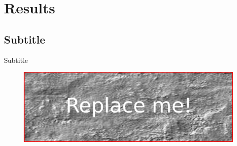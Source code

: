 \section{Results}
\subsection{Subtitle}
\begin{frame}{Subtitle}
\begin{center}
    \begin{figure}[ht]
        \centering
      \includegraphics[width=.95\textwidth,height=\textheight,keepaspectratio]{pictures/logo.png}
    \end{figure}
\end{center}
\end{frame}
%
%